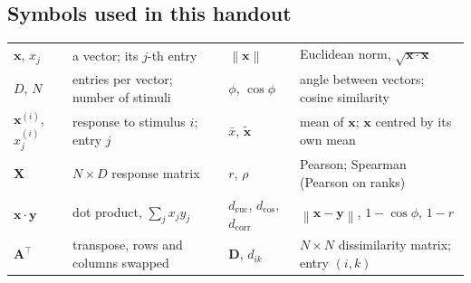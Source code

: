 \documentclass[11pt]{article}
\newcommand{\vx}{\bm{x}}
\newcommand{\vy}{\bm{y}}
\newcommand{\mX}{\bm{X}}
\newcommand{\mD}{\bm{D}}
\newcommand{\norm}[1]{\left\lVert #1 \right\rVert}
\newcommand{\deuc}{d_{\mathrm{euc}}}
\newcommand{\dcos}{d_{\cos}}
\newcommand{\dcorr}{d_{\mathrm{corr}}}
\begin{document}
\subsection*{Symbols used in this handout}
\begin{center}
\footnotesize
\setlength{\tabcolsep}{4pt}
\begin{tabular}{@{}ll@{\quad}ll@{}}
\toprule
$\vx$, $x_j$ & a vector; its $j$-th entry & $\norm{\vx}$ & Euclidean norm, $\sqrt{\vx \cdot \vx}$ \\
$D$, $N$ & entries per vector; number of stimuli & $\phi$, $\cos\phi$ & angle between vectors; cosine similarity \\
$\vx^{(i)}$, $x^{(i)}_j$ & response to stimulus $i$; entry $j$ & $\bar{x}$, $\tilde{\vx}$ & mean of $\vx$; $\vx$ centred by its own mean \\
$\mX$ & $N \times D$ response matrix & $r$, $\rho$ & Pearson; Spearman (Pearson on ranks) \\
$\vx \cdot \vy$ & dot product, $\sum_j x_j y_j$ & $\deuc$, $\dcos$, $\dcorr$ & $\norm{\vx - \vy}$, $1 - \cos\phi$, $1 - r$ \\
$\bm{A}^{\top}$ & transpose, rows and columns swapped & $\mD$, $d_{ik}$ & $N \times N$ dissimilarity matrix; entry $(i,k)$ \\
\bottomrule
\end{tabular}
\end{center}
\end{document}
